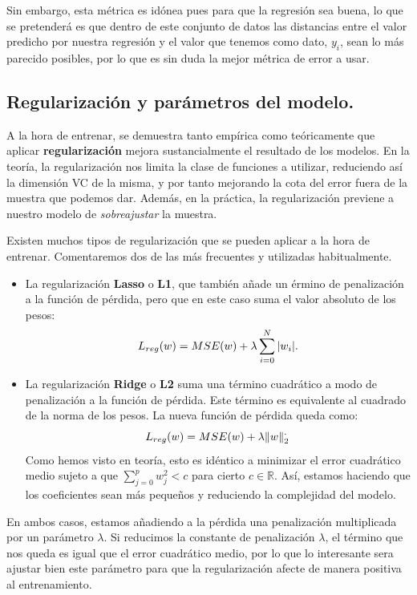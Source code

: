 \documentclass[a4paper, 20pt]{article}
\newcommand{\R}{\mathbb R}
\begin{document}
Sin embargo, esta métrica es idónea pues para que la regresión sea buena, lo que se pretenderá es que dentro de este conjunto de datos las distancias entre el valor predicho por nuestra regresión y el valor que tenemos como dato, $y_i$, sean lo más parecido posibles, por lo que es sin duda la mejor métrica de error a usar.


\subsection{Regularización y parámetros del modelo.}

A la hora de entrenar, se demuestra tanto empírica como teóricamente que aplicar \textbf{regularización} mejora sustancialmente el resultado de los modelos. En la teoría, la regularización nos limita la clase de funciones a utilizar, reduciendo así la dimensión VC de la misma, y por tanto mejorando la cota del error fuera de la muestra que podemos dar. Además, en la práctica, la regularización previene a nuestro modelo de \emph{sobreajustar} la muestra.

Existen muchos tipos de regularización que se pueden aplicar a la hora de entrenar. Comentaremos dos de las más frecuentes y utilizadas habitualmente. 

\begin{itemize}
   

    \item La regularización \textbf{Lasso} o \textbf{L1}, que también añade un érmino de penalización a la función de pérdida, pero que en este caso suma el valor absoluto de los pesos:
    $$
    L_{reg}(w) = MSE(w) + \lambda \sum_{i = 0}^N \abs{w_i}.
    $$

    \item La regularización \textbf{Ridge} o \textbf{L2} suma una término cuadrático a modo de penalización a la función de pérdida. Este término es equivalente al cuadrado de la norma de los pesos.  La nueva función de pérdida queda como:
    $$
    L_{reg}(w) = MSE(w) + \lambda \norm{w}_2^.
    $$
    Como hemos visto en teoría, esto es idéntico a minimizar el error cuadrático medio sujeto a que $\sum_{j = 0}^p w_j^2 < c$ para cierto $c\in \R$. Así, estamos haciendo que los coeficientes sean más pequeños y reduciendo la complejidad del modelo.
\end{itemize}

En ambos casos, estamos añadiendo a la pérdida una penalización multiplicada por un parámetro $\lambda$. Si reducimos la constante de penalización $\lambda$, el término que nos queda es igual que el error cuadrático medio, por lo que lo interesante sera ajustar bien este parámetro para que la regularización afecte de manera positiva al entrenamiento.
\end{document}
